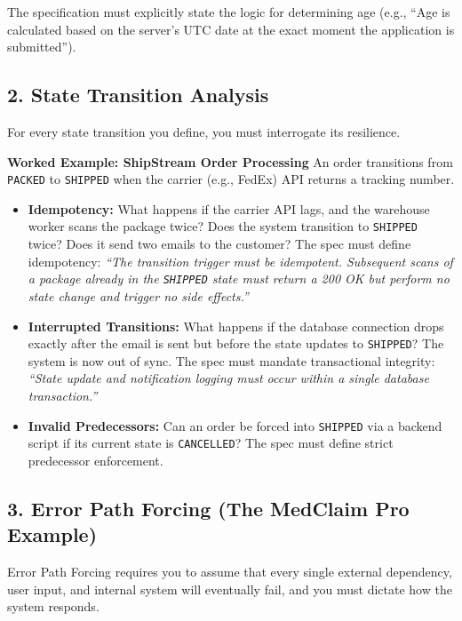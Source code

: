 \documentclass[
  11pt,
  openany,
  oneside]{book}
\providecommand{\tightlist}{%
  \setlength{\itemsep}{0pt}\setlength{\parskip}{0pt}}
\begin{document}
The specification must explicitly state the logic for determining age
(e.g., ``Age is calculated based on the server's UTC date at the exact
moment the application is submitted'').

\subsection{2. State Transition
Analysis}\label{state-transition-analysis}

For every state transition you define, you must interrogate its
resilience.

\textbf{Worked Example: ShipStream Order Processing} An order
transitions from \texttt{PACKED} to \texttt{SHIPPED} when the carrier
(e.g., FedEx) API returns a tracking number.

\begin{itemize}
\tightlist
\item
  \textbf{Idempotency:} What happens if the carrier API lags, and the
  warehouse worker scans the package twice? Does the system transition
  to \texttt{SHIPPED} twice? Does it send two emails to the customer?
  The spec must define idempotency: \emph{``The transition trigger must
  be idempotent. Subsequent scans of a package already in the
  \texttt{SHIPPED} state must return a 200 OK but perform no state
  change and trigger no side effects.''}
\item
  \textbf{Interrupted Transitions:} What happens if the database
  connection drops exactly after the email is sent but before the state
  updates to \texttt{SHIPPED}? The system is now out of sync. The spec
  must mandate transactional integrity: \emph{``State update and
  notification logging must occur within a single database
  transaction.''}
\item
  \textbf{Invalid Predecessors:} Can an order be forced into
  \texttt{SHIPPED} via a backend script if its current state is
  \texttt{CANCELLED}? The spec must define strict predecessor
  enforcement.
\end{itemize}

\subsection{3. Error Path Forcing (The MedClaim Pro
Example)}\label{error-path-forcing-the-medclaim-pro-example}

Error Path Forcing requires you to assume that every single external
dependency, user input, and internal system will eventually fail, and
you must dictate how the system responds.
\end{document}
